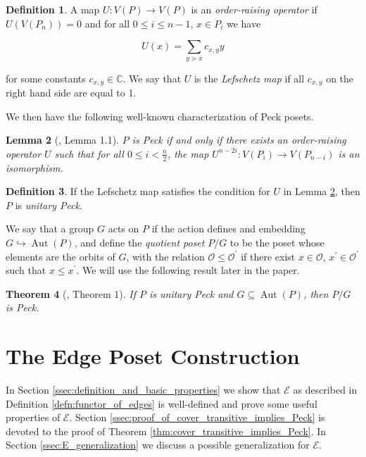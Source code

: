 \documentclass[10 pt]{amsart}
\theoremstyle{plain}
\newtheorem{thm}{Theorem}[section]
\newtheorem{lem}[thm]{Lemma}
\theoremstyle{definition}
\newtheorem{defn}[thm]{Definition}
\theoremstyle{remark}
\numberwithin{equation}{section}
\begin{document}
\begin{defn}
\label{defn:lefschetz}
A map $U\colon V(P)\rightarrow V(P)$ is an \textit{order-raising operator} if $U(V(P_n)) = 0$ and for all $0\le i\le n-1$, $x\in P_i$ we have

$$U(x) = \sum_{y\gtrdot x} c_{x,y}y$$

\noindent for some constants $c_{x,y}\in \mathbb{C}$.  We say that $U$ is the \textit{Lefschetz map} if all $c_{x,y}$ on the right hand side are equal to 1.
\end{defn}

\noindent We then have the following well-known characterization of Peck posets.

\begin{lem}[\cite{weyl_groups_stanley}, Lemma 1.1]\label{lem:Peck_poset_characterization}
$P$ is Peck if and only if there exists an order-raising operator $U$ such that for all $0\le i < \frac{n}{2}$, the map $U^{n-2i}\colon V(P_i)\rightarrow V(P_{n-i})$ is an isomorphism.
\end{lem}

\begin{defn}
If the Lefschetz map satisfies the condition for $U$ in Lemma \ref{lem:Peck_poset_characterization}, then $P$ is \textit{unitary Peck}.
\end{defn}


We say that a group $G$ acts on $P$ if the action defines and embedding $G\hookrightarrow \operatorname{Aut}(P)$, and define the \textit{quotient poset} $P/G$ to be the poset whose elements are the orbits of $G$, with the relation $\mathcal{O}\le \mathcal{O}^\prime$ if there exist $x\in \mathcal{O}$, $x^\prime\in \mathcal{O}^\prime$ such that $x\le x^\prime$.  We will use the following result later in the paper.

\begin{thm}[\cite{quotients_stanley}, Theorem 1]
\label{thm:quotients_of_unitary_peck_posets}
If $P$ is unitary Peck and $G\subseteq\operatorname{Aut}(P)$, then $P/G$ is Peck.
\end{thm}



\section{The Edge Poset Construction}
\label{sec:functor_of_edges}

In Section \ref{ssec:definition_and_basic_properties} we show that $\mathcal E$ as described in Definition \ref{defn:functor_of_edges} is well-defined and prove some useful properties of $\mathcal E$.  Section \ref{ssec:proof_of_cover_transitive_implies_Peck} is devoted to the proof of Theorem \ref{thm:cover_transitive_implies_Peck}.  In Section \ref{ssec:E_generalization} we discuss a possible generalization for $\mathcal{E}$.
\end{document}
